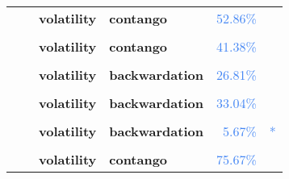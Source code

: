 \documentclass[
  authoryear,
  preprint,
  3p]{elsarticle}
\begin{document}
\begin{longtable}[t]{>{}l>{}l>{}l>{}l>{}r>{}r}
\textbf{} & \textbf{} & \textbf{volatility} & \textbf{contango} & \textcolor[HTML]{4285f4}{52.86\%} & \textcolor[HTML]{4285f4}{}\\
\textbf{\cellcolor{gray!10}{Cotton-\#2 (IFUS)}} & \textbf{\cellcolor{gray!10}{past}} & \textbf{\cellcolor{gray!10}{mean}} & \textbf{\cellcolor{gray!10}{backwardation}} & \textcolor[HTML]{4285f4}{\cellcolor{gray!10}{6.02\%}} & \textcolor[HTML]{4285f4}{\cellcolor{gray!10}{*}}\\
\textbf{} & \textbf{} & \textbf{volatility} & \textbf{contango} & \textcolor[HTML]{4285f4}{41.38\%} & \textcolor[HTML]{4285f4}{}\\
\addlinespace
\textbf{\cellcolor{gray!10}{}} & \textbf{\cellcolor{gray!10}{financialisation}} & \textbf{\cellcolor{gray!10}{mean}} & \textbf{\cellcolor{gray!10}{backwardation}} & \textcolor[HTML]{4285f4}{\cellcolor{gray!10}{59.06\%}} & \textcolor[HTML]{4285f4}{\cellcolor{gray!10}{}}\\
\textbf{} & \textbf{} & \textbf{volatility} & \textbf{backwardation} & \textcolor[HTML]{4285f4}{26.81\%} & \textcolor[HTML]{4285f4}{}\\
\textbf{\cellcolor{gray!10}{}} & \textbf{\cellcolor{gray!10}{crisis}} & \textbf{\cellcolor{gray!10}{mean}} & \textbf{\cellcolor{gray!10}{backwardation}} & \textcolor[HTML]{4285f4}{\cellcolor{gray!10}{14.44\%}} & \textcolor[HTML]{4285f4}{\cellcolor{gray!10}{}}\\
\textbf{} & \textbf{} & \textbf{volatility} & \textbf{backwardation} & \textcolor[HTML]{4285f4}{33.04\%} & \textcolor[HTML]{4285f4}{}\\
\textbf{\cellcolor{gray!10}{}} & \textbf{\cellcolor{gray!10}{post-crisis}} & \textbf{\cellcolor{gray!10}{mean}} & \textbf{\cellcolor{gray!10}{backwardation}} & \textcolor[HTML]{4285f4}{\cellcolor{gray!10}{32.06\%}} & \textcolor[HTML]{4285f4}{\cellcolor{gray!10}{}}\\
\addlinespace
\textbf{} & \textbf{} & \textbf{volatility} & \textbf{backwardation} & \textcolor[HTML]{4285f4}{5.67\%} & \textcolor[HTML]{4285f4}{*}\\
\textbf{\cellcolor{gray!10}{Lumber-random length (XCME)}} & \textbf{\cellcolor{gray!10}{past}} & \textbf{\cellcolor{gray!10}{mean}} & \textbf{\cellcolor{gray!10}{contango}} & \textcolor[HTML]{4285f4}{\cellcolor{gray!10}{37.56\%}} & \textcolor[HTML]{4285f4}{\cellcolor{gray!10}{}}\\
\textbf{} & \textbf{} & \textbf{volatility} & \textbf{contango} & \textcolor[HTML]{4285f4}{75.67\%} & \textcolor[HTML]{4285f4}{}\\

\end{longtable}
\end{document}
